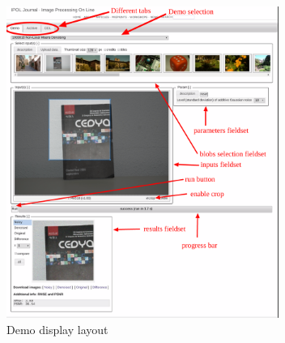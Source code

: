 \begin{figure}[H]
  \centering
  \includegraphics[width=3.5in]{Images/demo_capture}
  \caption{Demo display layout}
  \label{img:demo_snapshot}
\end{figure}

